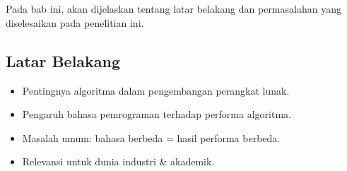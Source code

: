 \chapter{\babSatu}
\label{bab:1}
Pada bab ini, akan dijelaskan tentang latar belakang dan permasalahan yang diselesaikan pada penelitian ini.


\section{Latar Belakang}
\label{sec:latarBelakang}

\begin{itemize}
	\item Pentingnya algoritma dalam pengembangan perangkat lunak.
	\item Pengaruh bahasa pemrograman terhadap performa algoritma.
	\item Masalah umum: bahasa berbeda = hasil performa berbeda.
	\item Relevansi untuk dunia industri & akademik.
\end{itemize}



